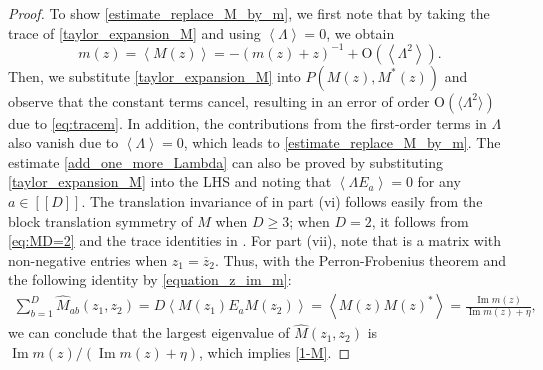\documentclass[10pt,reqno]{amsart}
\numberwithin{equation}{section}
\numberwithin{figure}{section}
\theoremstyle{plain} %
\theoremstyle{definition} %
\newcommand{\wh}{\widehat}
\newcommand{\qq}[1]{[\![{#1}]\!]}
\newcommand{\pa}[1]{\left({#1}\right)}
\newcommand{\absa}[1]{\left\lvert #1 \right\rvert}
\newcommand{\avga}[1]{\left\langle #1 \right\rangle}
\DeclareMathOperator{\re}{\mathrm{Re}}
\DeclareMathOperator{\im}{\mathrm{Im}}
\newcommand{\be}{\begin{equation}}
\newcommand{\ee}{\end{equation}}
\newcommand{\OO}{\mathrm{O}}
\numberwithin{equation}{section}
\begin{document}
\begin{proof}
To show \eqref{estimate_replace_M_by_m}, we first note that by taking the trace of \eqref{taylor_expansion_M} and using $\avga{\Lambda}=0$, we obtain 
\be\label{eq:tracem} m (z) =\avga{M (z) } = -(m(z)+z)^{-1}+\OO\pa{\avga{\Lambda^2}}.\ee
Then, we substitute \eqref{taylor_expansion_M} into $P\pa{M (z) ,M^* (z) }$ and observe that the constant terms cancel, resulting in an error of order $\OO(\langle \Lambda^2\rangle)$ due to \eqref{eq:tracem}. In addition, the contributions from the first-order terms in $\Lambda$ also vanish due to $\avga{\Lambda}=0$, which leads to \eqref{estimate_replace_M_by_m}. 
The estimate \eqref{add_one_more_Lambda} can also be proved by substituting \eqref{taylor_expansion_M} into the LHS and noting that $\avga{\Lambda E_a}=0$ for any $a\in \qq D$.
The translation invariance of \smash{$\wh M$} in part (vi) follows easily from the block translation symmetry of $M$ when $D\ge 3$; when $D=2$, it follows from \eqref{eq:MD=2} and the trace identities in . For part (vii), note that \smash{$\wh M$} is a matrix with non-negative entries when $z_1=\overline z_2$. Thus, with the Perron-Frobenius theorem and the following identity by \eqref{equation_z_im_m}:
    \begin{equation}\nonumber
        \begin{aligned}
            \sum_{b=1}^D\wh M_{ab}\pa{z_1,z_2}=D\avga{M(z_1)E_aM(z_2)}=\avga{M (z) M (z) ^*}=\frac{\im m (z) }{\im m (z) +\eta},
        \end{aligned}
    \end{equation}
    we can conclude that the largest eigenvalue of $\wh M\pa{z_1,z_2}$ is $\im m (z) /\pa{\im m (z) +\eta}$, which implies \eqref{1-M}.



\end{proof}
\end{document}
